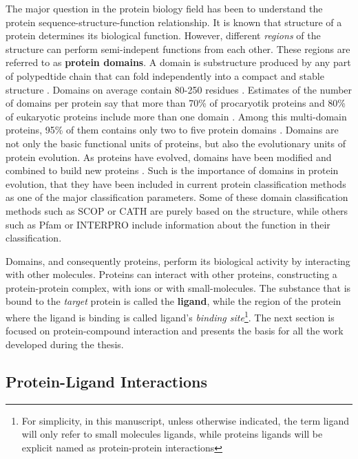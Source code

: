 \documentclass[12pt, a4paper,twoside]{tesi_upf}
\begin{document}
\par The major question in the protein biology field has been to understand the protein sequence-structure-function relationship. It is known that structure of a protein determines its biological function. However, different \textit{regions} of the structure can perform semi-indepent functions from each other. These regions are referred to as \textbf{protein domains}. A domain is substructure produced by any part of polypedtide chain that can fold independently into a compact and stable structure \cite{Richardson1981, That1991, DomainDef}. Domains on average contain 80-250 residues \cite{Islam1995}. Estimates of the number of domains per protein say that more than 70\% of procaryotik proteins and 80\% of eukaryotic proteins include more than one domain \cite{Han2007, Chothia2003}. Among this multi-domain proteins, 95\% of them contains only two to five protein domains \cite{Han2007}.  Domains are not only the basic functional units of proteins, but also the evolutionary units of protein evolution. As proteins have evolved, domains have been modified and combined to build new proteins \cite{Vogel2004, Apic2001}. 
Such is the importance  of domains in protein evolution, that they have been included in current protein classification methods as one of the major classification parameters. Some of these domain classification methods such as SCOP \cite{Murzin1995} or CATH \cite{Orengo1997} are purely based on the structure, while others such as Pfam \cite{Bateman2002} or INTERPRO \cite{Hunter2009} include information about the function in their classification. 
\par Domains, and consequently proteins, perform its biological activity by interacting with other molecules. Proteins can interact with other proteins, constructing a protein-protein complex, with ions or with small-molecules. The substance that is bound to the \textit{target} protein is called the \textbf{ligand}, while the region of the protein where the ligand is binding is called ligand's \textit{binding site}\footnote{For simplicity, in this manuscript, unless otherwise indicated, the term ligand will only refer to small molecules ligands, while proteins ligands will be explicit named as protein-protein interactions}. The next section is focused on protein-compound interaction and presents the basis for all the work developed during the thesis. 



\subsection{Protein-Ligand Interactions} \label{ligand_intect}
\end{document}
